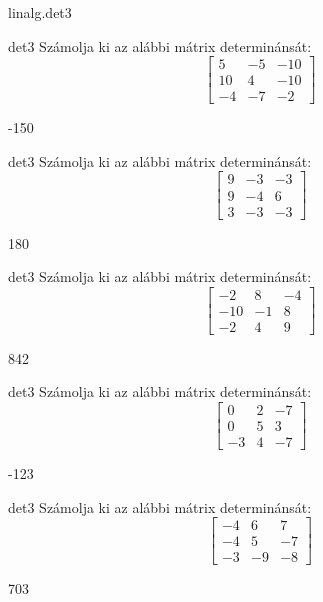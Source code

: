 \documentclass[12pt]{article}
\begin{document}
\begin{quiz}{linalg.det3}
\begin{numerical}{det3}
Számolja ki az alábbi mátrix determinánsát:
$$\left[\begin{array}{ccc}5& -5& -10\\ 10& 4& -10\\ -4& -7& -2\end{array}\right]$$

\item -150
\end{numerical}


\begin{numerical}{det3}
Számolja ki az alábbi mátrix determinánsát:
$$\left[\begin{array}{ccc}9& -3& -3\\ 9& -4& 6\\ 3& -3& -3\end{array}\right]$$

\item 180
\end{numerical}


\begin{numerical}{det3}
Számolja ki az alábbi mátrix determinánsát:
$$\left[\begin{array}{ccc}-2& 8& -4\\ -10& -1& 8\\ -2& 4& 9\end{array}\right]$$

\item 842
\end{numerical}


\begin{numerical}{det3}
Számolja ki az alábbi mátrix determinánsát:
$$\left[\begin{array}{ccc}0& 2& -7\\ 0& 5& 3\\ -3& 4& -7\end{array}\right]$$

\item -123
\end{numerical}


\begin{numerical}{det3}
Számolja ki az alábbi mátrix determinánsát:
$$\left[\begin{array}{ccc}-4& 6& 7\\ -4& 5& -7\\ -3& -9& -8\end{array}\right]$$

\item 703
\end{numerical}



\end{quiz}
\end{document}
